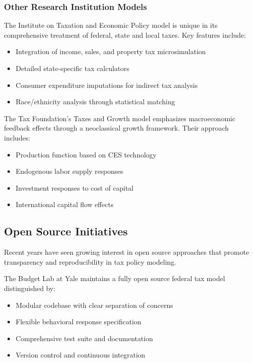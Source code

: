 \subsubsection{Other Research Institution Models}

The Institute on Taxation and Economic Policy model \citep{itep2024} is unique in its comprehensive treatment of federal, state and local taxes. Key features include:

\begin{itemize}
    \item Integration of income, sales, and property tax microsimulation
    \item Detailed state-specific tax calculators
    \item Consumer expenditure imputations for indirect tax analysis
    \item Race/ethnicity analysis through statistical matching
\end{itemize}

The Tax Foundation's Taxes and Growth model \citep{tf2024} emphasizes macroeconomic feedback effects through a neoclassical growth framework. Their approach includes:

\begin{itemize}
    \item Production function based on CES technology
    \item Endogenous labor supply responses
    \item Investment responses to cost of capital
    \item International capital flow effects
\end{itemize}

\subsection{Open Source Initiatives}

Recent years have seen growing interest in open source approaches that promote transparency and reproducibility in tax policy modeling.

The Budget Lab at Yale \citep{budgetlab2024} maintains a fully open source federal tax model distinguished by:

\begin{itemize}
    \item Modular codebase with clear separation of concerns
    \item Flexible behavioral response specification
    \item Comprehensive test suite and documentation
    \item Version control and continuous integration
\end{itemize}

